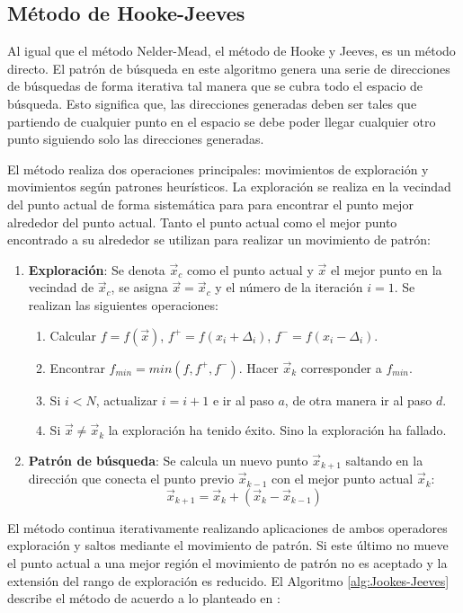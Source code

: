\subsection{Método de Hooke-Jeeves}
Al igual que el método Nelder-Mead, el método de Hooke y Jeeves, es un método directo.  El patrón de búsqueda en este algoritmo genera una serie de direcciones de búsquedas de forma iterativa tal manera que se cubra todo el espacio de búsqueda. Esto significa que, las direcciones generadas deben ser tales que partiendo de cualquier punto en el espacio se debe poder llegar cualquier otro punto siguiendo solo las direcciones generadas. 

El método realiza dos operaciones principales: movimientos de exploración y movimientos según patrones heurísticos. La exploración se realiza en la vecindad del punto actual de forma sistemática para para encontrar el punto mejor alrededor del punto actual. Tanto el punto actual como el mejor punto encontrado a su alrededor se utilizan para realizar un movimiento de patrón:
\begin{enumerate}
\item \textbf{Exploración}: Se denota $\vec{x}_c$ como el punto actual y $\vec{x}$ el mejor punto en la vecindad de $\vec{x}_c$, se asigna $\vec{x}=\vec{x}_c$ y el número de la iteración $i=1$. Se realizan las siguientes operaciones:
\begin{enumerate}
\item Calcular $f=f(\vec{x})$, $f^+=f(x_i+ \Delta_i)$, $f^-=f(x_i- \Delta_i)$.
\item Encontrar $f_{min}= min(f,f^+,f^-)$. Hacer $\vec{x}_k$ corresponder a $f_{min}$.
\item Si $i<N$, actualizar $i=i+1$ e ir al paso $a$, de otra manera ir al paso $d$. 
\item Si $\vec{x} \neq \vec{x}_k$ la exploración ha tenido éxito. Sino la exploración ha fallado. \\ 
\end{enumerate}

\item \textbf{Patrón de búsqueda}: Se calcula un nuevo punto $\vec{x}_{k+1}$ saltando en la dirección que conecta el punto previo $\vec{x}_{k-1}$ con el mejor punto actual $\vec{x}_k$:
\begin{equation}
\vec{x}_{k+1}=\vec{x}_{k}+(\vec{x}_{k}-\vec{x}_{k-1})
\end{equation}
\end{enumerate}
El método continua iterativamente realizando aplicaciones de ambos operadores exploración y saltos mediante el movimiento de patrón. Si este último no mueve el punto actual a una mejor región el movimiento de patrón no es aceptado y la extensión del rango de exploración es reducido. El Algoritmo \ref{alg:Jookes-Jeeves} describe el método de acuerdo a lo planteado en \cite{deb_optimization_2004}:
